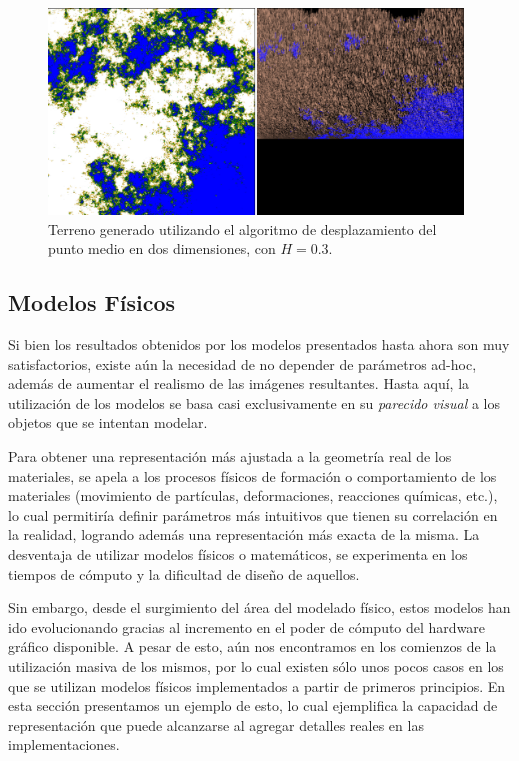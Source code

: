 \begin{figure}
\center
\includegraphics[width=11cm]{figures/terreno2}
\caption[Terreno generado utilizando el algoritmo de desplazamiento del punto medio en dos dimensiones, con $H = 0.3$]{Terreno generado utilizando el algoritmo de desplazamiento del punto medio en dos dimensiones, con $H = 0.3$.}
\label{fg:terreno2}
\end{figure}



\subsection{Modelos Físicos}
Si bien los resultados obtenidos por los modelos presentados hasta ahora son muy satisfactorios, existe aún la necesidad de no depender de parámetros ad-hoc, además de aumentar el realismo de las imágenes resultantes.
Hasta aquí, la utilización de los modelos se basa casi exclusivamente en su {\em parecido visual} a los objetos que se intentan modelar.

Para obtener una representación más ajustada a la geometría real de los materiales, se apela a los procesos físicos de formación o comportamiento de los materiales (movimiento de partículas, deformaciones, reacciones químicas, etc.), lo cual permitiría definir parámetros más intuitivos que tienen su correlación en la realidad, logrando además una representación más exacta de la misma.
La desventaja de utilizar modelos físicos o matemáticos, se experimenta en los tiempos de cómputo y la dificultad de diseño de aquellos.

Sin embargo, desde el surgimiento del área del modelado físico, estos modelos han ido evolucionando gracias al incremento en el poder de cómputo del hardware gráfico disponible. A pesar de esto, aún nos encontramos en los comienzos de la utilización masiva de los mismos, por lo cual existen sólo unos pocos casos en los que se utilizan modelos físicos implementados a partir de primeros principios.
En esta sección presentamos un ejemplo de esto, lo cual ejemplifica la capacidad de representación que puede alcanzarse al agregar detalles reales en las implementaciones.

